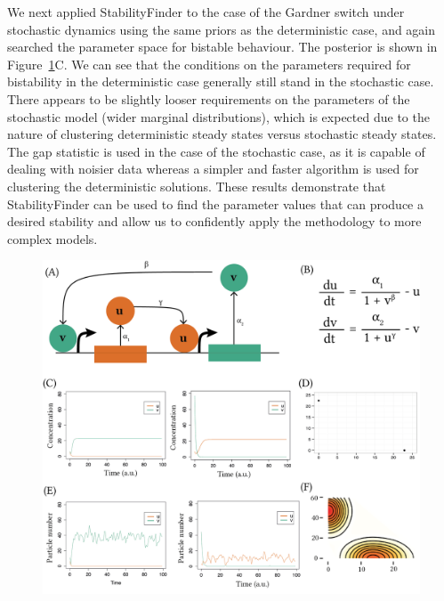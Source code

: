 {We next applied StabilityFinder to the case of the Gardner switch under stochastic dynamics using the same priors as the deterministic case, and again searched the parameter space for bistable behaviour. The posterior is shown in Figure~\ref{fig:gard_mod}C. We can see that the conditions on the parameters required for bistability in the deterministic case generally still stand in the stochastic case. There appears to be slightly looser requirements on the parameters of the stochastic model (wider marginal distributions), which is expected due to the nature of clustering deterministic steady states versus stochastic steady states. The gap statistic is used in the case of the stochastic case, as it is capable of dealing with noisier data whereas a simpler and faster algorithm is used for clustering the deterministic solutions. These results demonstrate that StabilityFinder can be used to find the parameter values that can produce a desired stability and allow us to confidently apply the methodology to more complex models.


\begin{figure}[htbp]
\begin{center}
	\includegraphics[scale=0.8]{chapterStabilityFinder/images/gardner_model.png}
	\caption[LoF caption]{\label{fig:gard_mod}}
\end{center}
\end{figure}

}
